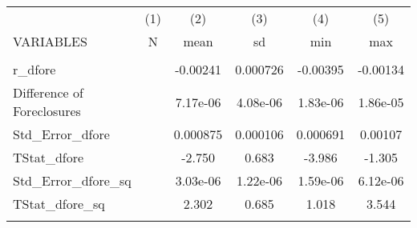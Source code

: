 \documentclass[]{article}
\begin{document}
\begin{center}
\begin{tabular}{lccccc} \hline
 & (1) & (2) & (3) & (4) & (5) \\
VARIABLES & N & mean & sd & min & max \\ \hline
\vspace{4pt} & \begin{footnotesize}\end{footnotesize} & \begin{footnotesize}\end{footnotesize} & \begin{footnotesize}\end{footnotesize} & \begin{footnotesize}\end{footnotesize} & \begin{footnotesize}\end{footnotesize} \\


r\_dfore &  & -0.00241 & 0.000726 & -0.00395 & -0.00134 \\
Difference of Foreclosures\ &  & 7.17e-06 & 4.08e-06 & 1.83e-06 & 1.86e-05 \\
Std\_Error\_dfore &  & 0.000875 & 0.000106 & 0.000691 & 0.00107 \\
TStat\_dfore &  & -2.750 & 0.683 & -3.986 & -1.305 \\
Std\_Error\_dfore\_sq &  & 3.03e-06 & 1.22e-06 & 1.59e-06 & 6.12e-06 \\
TStat\_dfore\_sq &  & 2.302 & 0.685 & 1.018 & 3.544 \\
 & \begin{footnotesize}\end{footnotesize} & \begin{footnotesize}\end{footnotesize} & \begin{footnotesize}\end{footnotesize} & \begin{footnotesize}\end{footnotesize} & \begin{footnotesize}\end{footnotesize} \\ \hline
\end{tabular}
\end{center}
\end{document}
